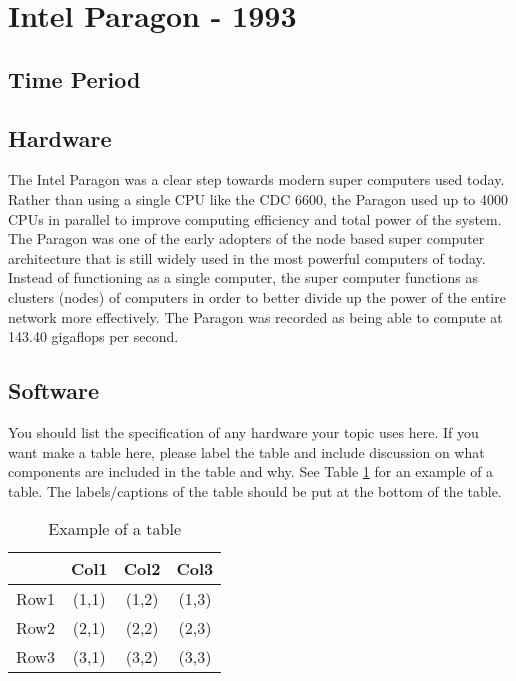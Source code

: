 \documentclass[letterpaper, 10 pt, conference]{IEEEconf}
\begin{document}
\section{Intel Paragon - 1993}
\subsection{Time Period}
\subsection{Hardware}
The Intel Paragon was a clear step towards modern super computers used today. Rather than using a single CPU like the CDC 6600, the Paragon used up to 4000 CPUs in parallel to improve computing efficiency and total power of the system. The Paragon was one of the early adopters of the node based super computer architecture that is still widely used in the most powerful computers of today. Instead of functioning as a single computer, the super computer functions as clusters (nodes) of computers in order to better divide up the power of the entire network more effectively. The Paragon was recorded as being able to compute at 143.40 gigaflops per second. 
\subsection{Software}

You should list the specification of any hardware your topic
uses here. If you want make a table here, please label the table
and include discussion on what components are included in the
table and why. See Table
\ref{tbl:example} for an example of a table.
The labels/captions of the table should be put at the bottom
of the table.


\begin{table}[h!]
\begin{center}
\begin{tabular}{||c | c | c | c||} 
\hline
  & Col1 & Col2 & Col3 \\ [0.5ex]
\hline\hline
Row1 & (1,1) & (1,2) & (1,3) \\ 
\hline
Row2 & (2,1) & (2,2) & (2,3) \\
\hline
Row3 & (3,1) & (3,2) & (3,3) \\
\hline
\end{tabular}
\caption{Example of a table}
\label{tbl:example}
\end{center}
\end{table}
\end{document}
